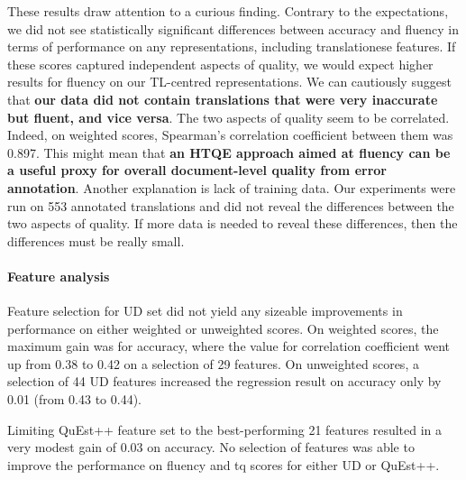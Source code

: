 These results draw attention to a curious finding. Contrary to the expectations, we did not see statistically significant differences between accuracy and fluency in terms of performance on any representations, including translationese features. If these scores captured independent aspects of quality, we would expect higher results for fluency on our TL-centred representations. We can cautiously suggest that \textbf{our data did not contain translations that were very inaccurate but fluent, and vice versa}. The two aspects of quality seem to be correlated. Indeed, on weighted scores, Spearman's correlation coefficient between them was 0.897. %
This might mean that \textbf{an \gls*{HTQE} approach aimed at fluency can be a useful proxy for overall document-level quality from error annotation}.
Another explanation is lack of training data. Our experiments were run on 553 annotated translations and did not reveal the differences between the two aspects of quality. If more data is needed to reveal these differences, then the differences must be really small. 

\paragraph{Feature analysis} 
Feature selection for UD set did not yield any sizeable improvements in performance on either weighted or unweighted scores. 
On weighted scores, the maximum gain was for accuracy, where the value for correlation coefficient went up from 0.38 to 0.42 on a selection of 29 features. On unweighted scores, a selection of 44 UD features increased the regression result on accuracy only by 0.01 (from 0.43 to 0.44). 

Limiting QuEst++ feature set to the best-performing 21 features resulted in a very modest gain of 0.03 on accuracy. %
No selection of features was able to improve the performance on fluency and tq scores for either UD or QuEst++. 

